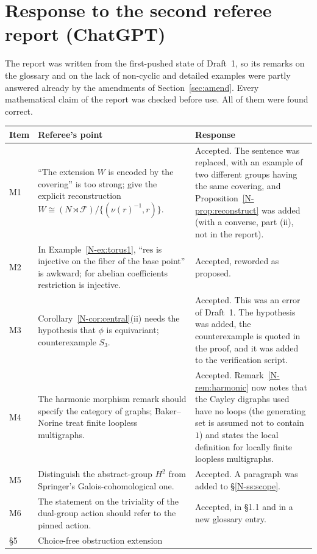 \documentclass[12pt,letterpaper]{article}
\begin{document}
\section{Response to the second referee report (ChatGPT)}\label{sec:chatgpt}

The report was written from the first-pushed state of Draft~1, so its
remarks on the glossary and on the lack of non-cyclic and detailed
examples were partly answered already by the amendments of
Section~\ref{sec:amend}. Every mathematical claim of the report was
checked before use. All of them were found correct.

\begin{longtable}{@{}p{}p{}p{}@{}}
\toprule
Item & Referee's point & Response \\
\midrule
\endhead
M1 & ``The extension $W$ is encoded by the covering'' is too strong; give
the explicit reconstruction $W\cong(N\rtimes\mathcal{F})/\{(\nu(r)^{-1},r)\}$.
& Accepted. The sentence was replaced, with an example of two different
groups having the same covering, and
Proposition~\ref{N-prop:reconstruct} was added (with a converse, part
(ii), not in the report). \\
M2 & In Example~\ref{N-ex:torus1}, ``$\mathrm{res}$ is injective on the
fiber of the base point'' is awkward; for abelian coefficients
restriction is injective. & Accepted, reworded as proposed. \\
M3 & Corollary~\ref{N-cor:central}(ii) needs the hypothesis that $\phi$
is equivariant; counterexample $S_3$. & Accepted. This was an error of
Draft~1. The hypothesis was added, the counterexample is quoted in the
proof, and it was added to the verification script. \\
M4 & The harmonic morphism remark should specify the category of graphs;
Baker--Norine treat finite loopless multigraphs. & Accepted.
Remark~\ref{N-rem:harmonic} now notes that the Cayley digraphs used have
no loops (the generating set is assumed not to contain $1$) and states
the local definition for locally finite loopless multigraphs. \\
M5 & Distinguish the abstract-group $H^2$ from Springer's
Galois-cohomological one. & Accepted. A paragraph was added to
\S\ref{N-ss:scope}. \\
M6 & The statement on the triviality of the dual-group action should
refer to the pinned action. & Accepted, in \S1.1 and in a new glossary
entry. \\
\S5 & Choice-free obstruction extension

\end{longtable}
\end{document}
